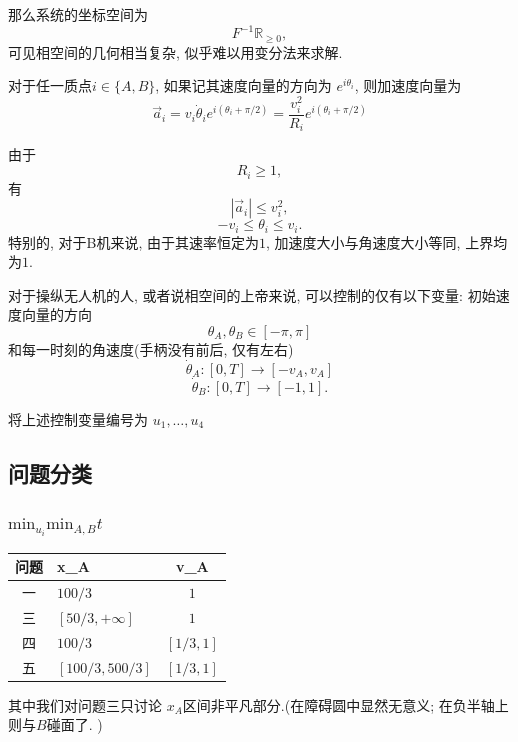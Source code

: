 \documentclass[withoutpreface,bwprint]{cumcmthesis}
\begin{document}
那么系统的坐标空间为 \[ F^{-1}\mathbb{R}_{\geq 0}, \]
可见相空间的几何相当复杂, 似乎难以用变分法来求解. 

对于任一质点$i\in\{A,B\}$, 如果记其速度向量的方向为 $e^{i\theta_i}$, 则加速度向量为 \[ \vec{a}_i = v_i \dot{\theta}_i e^{i(\theta_i+\pi/2)}=\frac{v_i^2}{R_i} e^{i(\theta_i+\pi/2)} \]

由于\[ R_i\geq 1, \]
有\[ |\vec{a}_i|\leq v_i^2, \]
\[ -v_i \leq \theta_i \leq v_i. \]
特别的, 对于B机来说, 由于其速率恒定为$1$, 加速度大小与角速度大小等同, 上界均为$1$. 

对于操纵无人机的人, 或者说相空间的上帝来说, 可以控制的仅有以下变量: 初始速度向量的方向 
\[ \theta_A,\theta_B \in [-\pi,\pi] \]
和每一时刻的角速度(手柄没有前后, 仅有左右) 
\[ \dot\theta_A: [0,T]\to [-v_A,v_A] \]
\[ \dot\theta_B: [0,T]\to [-1,1]. \]

将上述控制变量编号为 $u_1,\dots,u_4$








\subsection{问题分类}
\subsubsection{$\text{min}_{u_i}\text{min}_{A,B}t$}

\begin{table}[H]
\centering
\begin{tabularx}{\textwidth}{CLC}
\toprule
问题    & x_A    & v_A \\
\midrule
一& $100/3$ & $1$ \\
三& $[50/3,+\infty]$ & $1$ \\
四& $100/3$ & $[1/3,1]$ \\
五& $[100/3,500/3]$ & $[1/3,1]$ \\
\bottomrule
\end{tabularx}
\label{tab:符号说明}
\end{table}
其中我们对问题三只讨论 $x_A$区间非平凡部分.(在障碍圆中显然无意义; 在负半轴上则与$B$碰面了. )
\end{document}
